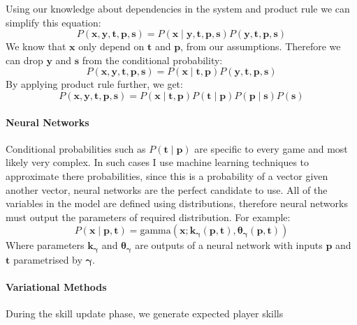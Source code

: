 \documentclass[12pt,a4paper]{book}
\newcommand\bs[1]{\boldsymbol{#1}}
\begin{document}
Using our knowledge about dependencies in the system and product rule we can simplify this equation:
\begin{equation}
P(\bs{x},\bs{y},\bs{t},\bs{p},\bs{s}) = P(\bs{x}\mid\bs{y},\bs{t},\bs{p},\bs{s}) P(\bs{y},\bs{t},\bs{p},\bs{s})
\end{equation}
We know that $\bs{x}$ only depend on $\bs{t}$ and $\bs{p}$, from our assumptions.
Therefore we can drop $\bs{y}$ and $\bs{s}$ from the conditional probability:
\begin{equation}
P(\bs{x},\bs{y},\bs{t},\bs{p},\bs{s}) = P(\bs{x}\mid\bs{t},\bs{p}) P(\bs{y},\bs{t},\bs{p},\bs{s})
\end{equation}
By applying product rule further, we get:
\begin{equation}
P(\bs{x},\bs{y},\bs{t},\bs{p},\bs{s}) = P(\bs{x}\mid\bs{t},\bs{p}) P(\bs{t}\mid\bs{p}) P(\bs{p}\mid\bs{s}) P(\bs{s})
\end{equation}
\paragraph{Neural Networks}
Conditional probabilities such as $P(\bs{t}\mid \bs{p})$ are specific to every game and most likely very complex.
In such cases I use machine learning techniques to approximate there probabilities, since this is a probability of a vector given another vector, neural networks are the perfect candidate to use.
All of the variables in the model are defined using distributions, therefore neural networks must output the parameters of required distribution.
For example:
\begin{equation}
P(\bs{x} \mid \bs{p},\bs{t})=\text{gamma}(\bs{x};\bs{k_\gamma}(\bs{p},\bs{t}), \bs{\theta_\gamma}(\bs{p},\bs{t}))
\end{equation}
Where parameters $\bs{k_\gamma}$ and $\bs{\theta_\gamma}$ are outputs of a neural network with inputs $\bs{p}$ and $\bs{t}$ parametrised by $\bs{\gamma}$.
\paragraph{Variational Methods}
During the skill update phase, we generate expected player skills 
\end{document}
